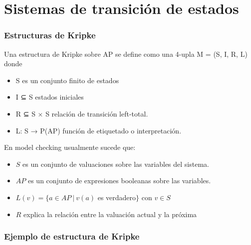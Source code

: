 \documentclass[serif]{beamer}
\begin{document}


\section[Teoría]{Sistemas de transición de estados}

\begin{frame}
\frametitle{Estructuras de Kripke}
Una estructura de Kripke sobre AP se define
como una 4-upla M = (S, I, R, L) donde\\[0.5cm]
\begin{itemize}
\item S es un conjunto finito de estados
\item I ⊆ S estados iniciales
\item R ⊆ S × S relación de transición left-total.
\item L: S → P(AP) función de etiquetado o
interpretación.
\end{itemize}
\end{frame}

\begin{frame}

En model checking usualmente sucede que:\\[0.5cm]
\begin{itemize}
\item $S$ es un conjunto de valuaciones sobre las variables del sistema.
\item $AP$ es un conjunto de expresiones booleanas sobre las variables.
\item $L(v) = \lbrace a \in AP~|~v(a)$ es verdadero$\rbrace$ con $v \in S$
\item $R$ explica la relación entre la valuación actual y la próxima
\end{itemize}

\end{frame}


\begin{frame}
\frametitle{Ejemplo de estructura de Kripke}
\end{frame}
\end{document}
